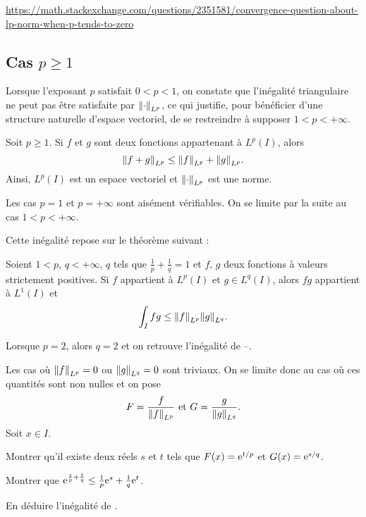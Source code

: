 \url{https://math.stackexchange.com/questions/2351581/convergence-question-about-lp-norm-when-p-tends-to-zero}


\subsection{Cas $p \geq 1$}

Lorsque l'exposant $p$ satisfait $0 < p < 1$, on constate que l'inégalité triangulaire ne peut pas être satisfaite par $\norm{\cdot}_{L^p}$, ce qui justifie, pour bénéficier d’une structure naturelle d’espace vectoriel, de se restreindre à supposer $1 < p < +\infty$.

\begin{theo}
Soit $p \geq 1$. Si $f$ et $g$ sont deux fonctions appartenant à $L^p(I)$, alors
\[
\norm{f + g}_{L^p} \leq \norm{f}_{L^p} + \norm{g}_{L^p}.
\]
Ainsi, $L^p(I)$ est un espace vectoriel et $\norm{\cdot}_{L^p}$ est une norme.
\end{theo}

\begin{remarque}
Les cas $p = 1$ et $p = +\infty$ sont aisément vérifiables. On se limite par la suite au cas $1 < p < +\infty$.
\end{remarque}

Cette inégalité repose sur le théorème suivant :
\begin{theo}
Soient $1 < p,\, q < +\infty$, $q$ tels que $\frac{1}{p} + \frac{1}{q} = 1$ et $f,\, g$ deux fonctions à valeurs strictement positives. Si $f$ appartient à $L^p(I)$ et $g \in L^q(I)$, alors $f g$ appartient à $L^1(I)$ et
\[
\int_I f g \leq \norm{f}_{L^p} \norm{g}_{L^q}.
\]
\end{theo}

\begin{remarque}
Lorsque $p = 2$, alors $q = 2$ et on retrouve l'inégalité de --.
\end{remarque}

\begin{exercice}
Les cas où $\norm{f}_{L^p} = 0$ ou $\norm{g}_{L^q} = 0$ sont triviaux. On se limite donc au cas où ces quantités sont non nulles et on pose
\[
F = \frac{f}{\norm{f}_{L^p}}
\text{ et }
G = \frac{g}{\norm{g}_{L^q}}.
\]
Soit $x \in I$.
\begin{questions}
\item Montrer qu'il existe deux réels $s$ et $t$ tels que $F(x) = \mathrm{e}^{t/p}$ et $G(x) = \mathrm{e}^{s/q}$.

\item Montrer que $\mathrm{e}^{\frac{s}{p} + \frac{t}{q}} \leq \frac{1}{p} \mathrm{e}^s + \frac{1}{q} \mathrm{e}^t$.

\item En déduire l'inégalité de .
\end{questions}
\end{exercice}


